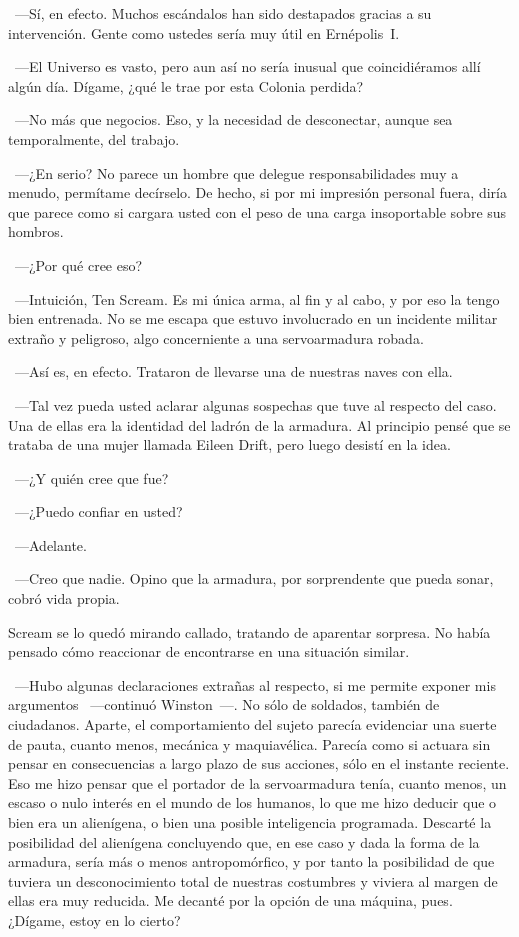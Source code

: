 ~---Sí, en efecto. Muchos escándalos han sido destapados gracias a su intervención. Gente como ustedes sería muy útil en Ernépolis~I.

~---El Universo es vasto, pero aun así no sería inusual que coincidiéramos allí algún día. Dígame, ¿qué le trae por esta Colonia perdida?

~---No más que negocios. Eso, y la necesidad de desconectar, aunque sea temporalmente, del trabajo.

~---¿En serio? No parece un hombre que delegue responsabilidades muy a menudo, permítame decírselo. De hecho, si por mi impresión personal fuera, diría que parece como si cargara usted con el peso de una carga insoportable sobre sus hombros.

~---¿Por qué cree eso?

~---Intuición, Ten Scream. Es mi única arma, al fin y al cabo, y por eso la tengo bien entrenada. No se me escapa que estuvo involucrado en un incidente militar extraño y peligroso, algo concerniente a una servoarmadura robada.

~---Así es, en efecto. Trataron de llevarse una de nuestras naves con ella.

~---Tal vez pueda usted aclarar algunas sospechas que tuve al respecto del caso. Una de ellas era la identidad del ladrón de la armadura. Al principio pensé que se trataba de una mujer llamada Eileen Drift, pero luego desistí en la idea.

~---¿Y quién cree que fue?

~---¿Puedo confiar en usted?

~---Adelante.

~---Creo que nadie. Opino que la armadura, por sorprendente que pueda sonar, cobró vida propia.

Scream se lo quedó mirando callado, tratando de aparentar sorpresa. No había pensado cómo reaccionar de encontrarse en una situación similar.

~---Hubo algunas declaraciones extrañas al respecto, si me permite exponer mis argumentos ~---continuó Winston~---. No sólo de soldados, también de ciudadanos. Aparte, el comportamiento del sujeto parecía evidenciar una suerte de pauta, cuanto menos, mecánica y maquiavélica. Parecía como si actuara sin pensar en consecuencias a largo plazo de sus acciones, sólo en el instante reciente. Eso me hizo pensar que el portador de la servoarmadura tenía, cuanto menos, un escaso o nulo interés en el mundo de los humanos, lo que me hizo deducir que o bien era un alienígena, o bien una posible inteligencia programada. Descarté la posibilidad del alienígena concluyendo que, en ese caso y dada la forma de la armadura, sería más o menos antropomórfico, y por tanto la posibilidad de que tuviera un desconocimiento total de nuestras costumbres y viviera al margen de ellas era muy reducida. Me decanté por la opción de una máquina, pues. ¿Dígame, estoy en lo cierto?

